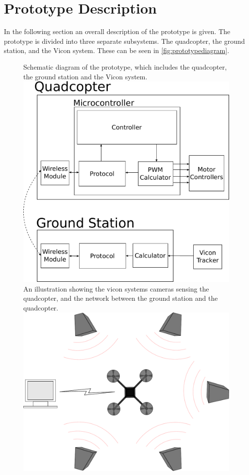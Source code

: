 \section{Prototype Description}\label{sec:PrototypeDescription}
In the following section an overall description of the prototype is given. %
The prototype is divided into three separate subsystems. The quadcopter, the ground station, and the Vicon system. These can be seen in \autoref{fig:prototypediagram}. 

\begin{figure}[H]
  \centering
  \captionbox
  {
    Schematic diagram of the prototype, which includes the quadcopter, the ground station and the Vicon system.
    \label{fig:prototypediagram}
  }
  {
    \includegraphics[width=.5\textwidth]{figures/prototypediagram}
  }
  \hspace{5pt}
  \captionbox
  {
   An illustration showing the vicon systems cameras sensing the quadcopter, and the network between the ground station and the quadcopter.
    \label{fig:Vicontotalsystem}
  }
  {
    \includegraphics[width=.40\textwidth]{figures/system.pdf}
  }
\end{figure}
